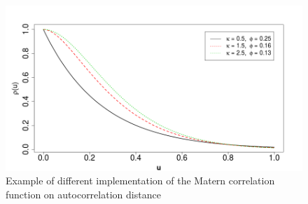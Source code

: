 \documentclass[review]{elsarticle}
\begin{document}
\begin{figure}[!ht]
	\includegraphics[width = \linewidth]{./Plots/Matern}
	\caption{Example of different implementation of the Matern correlation
	function on autocorrelation distance}
	\label{fig:16}
\end{figure}	
\end{document}
